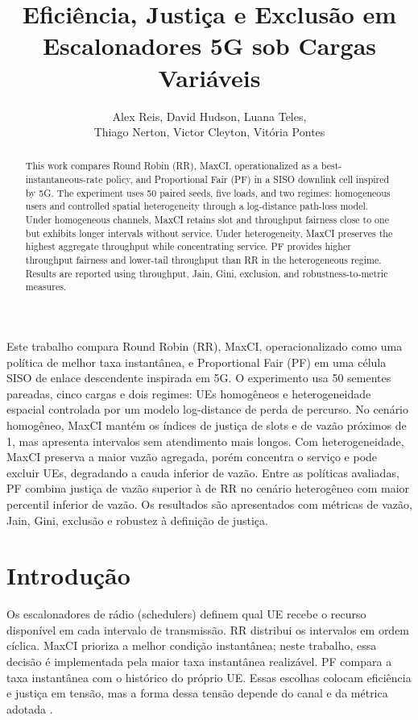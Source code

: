 \documentclass[12pt]{article}
\title{Eficiência, Justiça e Exclusão em Escalonadores 5G sob Cargas Variáveis}
\author{Alex Reis, David Hudson, Luana Teles,\\ Thiago Nerton, Victor Cleyton, Vitória Pontes}
\begin{document}
\maketitle

\begin{resumo}
Este trabalho compara Round Robin (RR), MaxCI, operacionalizado como uma política de melhor taxa instantânea, e Proportional Fair (PF) em uma célula SISO de enlace descendente inspirada em 5G. O experimento usa 50 sementes pareadas, cinco cargas e dois regimes: UEs homogêneos e heterogeneidade espacial controlada por um modelo log-distance de perda de percurso. No cenário homogêneo, MaxCI mantém os índices de justiça de slots e de vazão próximos de 1, mas apresenta intervalos sem atendimento mais longos. Com heterogeneidade, MaxCI preserva a maior vazão agregada, porém concentra o serviço e pode excluir UEs, degradando a cauda inferior de vazão. Entre as políticas avaliadas, PF combina justiça de vazão superior à de RR no cenário heterogêneo com maior percentil inferior de vazão. Os resultados são apresentados com métricas de vazão, Jain, Gini, exclusão e robustez à definição de justiça.
\end{resumo}

\begin{abstract}
This work compares Round Robin (RR), MaxCI, operationalized as a best-instantaneous-rate policy, and Proportional Fair (PF) in a SISO downlink cell inspired by 5G. The experiment uses 50 paired seeds, five loads, and two regimes: homogeneous users and controlled spatial heterogeneity through a log-distance path-loss model. Under homogeneous channels, MaxCI retains slot and throughput fairness close to one but exhibits longer intervals without service. Under heterogeneity, MaxCI preserves the highest aggregate throughput while concentrating service. PF provides higher throughput fairness and lower-tail throughput than RR in the heterogeneous regime. Results are reported using throughput, Jain, Gini, exclusion, and robustness-to-metric measures.
\end{abstract}

\section{Introdução}

Os escalonadores de rádio (schedulers) definem qual UE recebe o recurso disponível em cada intervalo de transmissão. RR distribui os intervalos em ordem cíclica. MaxCI prioriza a melhor condição instantânea; neste trabalho, essa decisão é implementada pela maior taxa instantânea realizável. PF compara a taxa instantânea com o histórico do próprio UE. Essas escolhas colocam eficiência e justiça em tensão, mas a forma dessa tensão depende do canal e da métrica adotada \cite{jain1984quantitativemeasurefairnessdiscrimination,tse2005fundamentals}.
\end{document}
